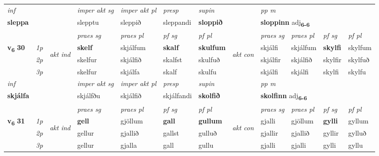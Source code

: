 \begin{longtable}[l]{X>{\footnotesize\itshape}llXXXXlXXXX}
   {\textit{inf}} & &  & \textit{imper akt sg} & \textit{imper akt pl}   & \textit{presp} & \textit{supin}  && \textit{pp m} \\*
  {\textbf{sleppa}} & && slepptu  & sleppið   & sleppandi &  \textbf{sloppið}  && \multicolumn{2}{l}{\textbf{sloppinn} adj\textbf{\textsubscript{6-6}}} \\*

\midrule

 & &   & \textit{praes sg}  & \textit{praes pl}    & \textit{ pf sg} & \textit{pf pl} & & \textit{praes sg}  & \textit{praes pl}    & \textit{pf sg} & \textit{pf pl }  \\ \cmidrule{4-7} \cmidrule{9-12}
 \multirow{2}{*}{{{\textbf{v{\textsubscript{6}}} \Large{\textbf{30}}}}}  & 1p & \multirow{3}{*}{\begin{turn}{90}\textit{akt ind}\end{turn}} & \textbf{skelf} & skjálfum & \textbf{skalf} & \textbf{skulfum} & \multirow{3}{*}{\begin{turn}{90}\textit{akt con}\end{turn}} &skjálfi & skjálfum & \textbf{skylfi} & skylfum\\*
 & 2p &  &  skelfur  & skjálfið & skalfst & skulfuð & & skjálfir & skjálfið & skylfir & skylfuð \\*
 & 3p &  & skelfur & skjálfa & skalf & skulfu & & skjálfi & skjálfi& skylfi & skylfu \\*
\cmidrule{4-7} \cmidrule{9-12}

   {\textit{inf}} & &  & \textit{imper akt sg} & \textit{imper akt pl}   & \textit{presp} & \textit{supin}  && \textit{pp m} \\*
  {\textbf{skjálfa}} & && skjálfðu  & skjálfið   & skjálfandi &  \textbf{skolfið}  && \multicolumn{2}{l}{\textbf{skolfinn} adj\textbf{\textsubscript{6-6}}} \\*

\midrule

 & &   & \textit{praes sg}  & \textit{praes pl}    & \textit{ pf sg} & \textit{pf pl} & & \textit{praes sg}  & \textit{praes pl}    & \textit{pf sg} & \textit{pf pl }  \\ \cmidrule{4-7} \cmidrule{9-12}
 \multirow{2}{*}{{{\textbf{v{\textsubscript{6}}} \Large{\textbf{31}}}}}  & 1p & \multirow{3}{*}{\begin{turn}{90}\textit{akt ind}\end{turn}} & \textbf{gell} & gjöllum & \textbf{gall} & \textbf{gullum} & \multirow{3}{*}{\begin{turn}{90}\textit{akt con}\end{turn}} &gjalli & gjöllum & \textbf{gylli} & gyllum\\*
 & 2p &  &  gellur  & gjallið & gallst & gulluð & & gjallir & gjallið & gyllir & gylluð \\*
 & 3p &  & gellur & gjalla & gall & gullu & & gjalli & gjalli& gylli & gyllu \\*
\cmidrule{4-7} \cmidrule{9-12}


\end{longtable}
